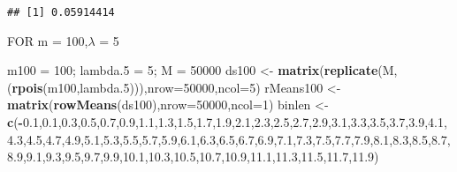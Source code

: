 \documentclass[
]{article}
\newenvironment{Shaded}{\begin{snugshade}}{\end{snugshade}}
\newcommand{\DataTypeTok}[1]{\textcolor[rgb]{0.13,0.29,0.53}{#1}}
\newcommand{\DecValTok}[1]{\textcolor[rgb]{0.00,0.00,0.81}{#1}}
\newcommand{\FloatTok}[1]{\textcolor[rgb]{0.00,0.00,0.81}{#1}}
\newcommand{\KeywordTok}[1]{\textcolor[rgb]{0.13,0.29,0.53}{\textbf{#1}}}
\newcommand{\NormalTok}[1]{#1}
\newcommand{\OperatorTok}[1]{\textcolor[rgb]{0.81,0.36,0.00}{\textbf{#1}}}
\newcommand{\StringTok}[1]{\textcolor[rgb]{0.31,0.60,0.02}{#1}}
\begin{document}
\begin{verbatim}
## [1] 0.05914414
\end{verbatim}

FOR m = 100,\(\lambda\) = 5

\begin{Shaded}
\begin{Highlighting}[]
\NormalTok{m100 =}\StringTok{ }\DecValTok{100}\NormalTok{; lambda}\FloatTok{.5}\NormalTok{ =}\StringTok{ }\DecValTok{5}\NormalTok{; M =}\StringTok{ }\DecValTok{50000}
\NormalTok{ds100 <-}\StringTok{ }\KeywordTok{matrix}\NormalTok{(}\KeywordTok{replicate}\NormalTok{(M,(}\KeywordTok{rpois}\NormalTok{(m100,lambda}\FloatTok{.5}\NormalTok{))),}\DataTypeTok{nrow=}\DecValTok{50000}\NormalTok{,}\DataTypeTok{ncol=}\DecValTok{5}\NormalTok{)}
\NormalTok{rMeans100 <-}\StringTok{ }\KeywordTok{matrix}\NormalTok{(}\KeywordTok{rowMeans}\NormalTok{(ds100),}\DataTypeTok{nrow=}\DecValTok{50000}\NormalTok{,}\DataTypeTok{ncol=}\DecValTok{1}\NormalTok{)}
\NormalTok{binlen <-}\StringTok{ }\KeywordTok{c}\NormalTok{(}\OperatorTok{-}\FloatTok{0.1}\NormalTok{,}\FloatTok{0.1}\NormalTok{,}\FloatTok{0.3}\NormalTok{,}\FloatTok{0.5}\NormalTok{,}\FloatTok{0.7}\NormalTok{,}\FloatTok{0.9}\NormalTok{,}\FloatTok{1.1}\NormalTok{,}\FloatTok{1.3}\NormalTok{,}\FloatTok{1.5}\NormalTok{,}\FloatTok{1.7}\NormalTok{,}\FloatTok{1.9}\NormalTok{,}\FloatTok{2.1}\NormalTok{,}\FloatTok{2.3}\NormalTok{,}\FloatTok{2.5}\NormalTok{,}\FloatTok{2.7}\NormalTok{,}\FloatTok{2.9}\NormalTok{,}\FloatTok{3.1}\NormalTok{,}\FloatTok{3.3}\NormalTok{,}\FloatTok{3.5}\NormalTok{,}\FloatTok{3.7}\NormalTok{,}\FloatTok{3.9}\NormalTok{,}\FloatTok{4.1}\NormalTok{,}\FloatTok{4.3}\NormalTok{,}\FloatTok{4.5}\NormalTok{,}\FloatTok{4.7}\NormalTok{,}\FloatTok{4.9}\NormalTok{,}\FloatTok{5.1}\NormalTok{,}\FloatTok{5.3}\NormalTok{,}\FloatTok{5.5}\NormalTok{,}\FloatTok{5.7}\NormalTok{,}\FloatTok{5.9}\NormalTok{,}\FloatTok{6.1}\NormalTok{,}\FloatTok{6.3}\NormalTok{,}\FloatTok{6.5}\NormalTok{,}\FloatTok{6.7}\NormalTok{,}\FloatTok{6.9}\NormalTok{,}\FloatTok{7.1}\NormalTok{,}\FloatTok{7.3}\NormalTok{,}\FloatTok{7.5}\NormalTok{,}\FloatTok{7.7}\NormalTok{,}\FloatTok{7.9}\NormalTok{,}\FloatTok{8.1}\NormalTok{,}\FloatTok{8.3}\NormalTok{,}\FloatTok{8.5}\NormalTok{,}\FloatTok{8.7}\NormalTok{,}\FloatTok{8.9}\NormalTok{,}\FloatTok{9.1}\NormalTok{,}\FloatTok{9.3}\NormalTok{,}\FloatTok{9.5}\NormalTok{,}\FloatTok{9.7}\NormalTok{,}\FloatTok{9.9}\NormalTok{,}\FloatTok{10.1}\NormalTok{,}\FloatTok{10.3}\NormalTok{,}\FloatTok{10.5}\NormalTok{,}\FloatTok{10.7}\NormalTok{,}\FloatTok{10.9}\NormalTok{,}\FloatTok{11.1}\NormalTok{,}\FloatTok{11.3}\NormalTok{,}\FloatTok{11.5}\NormalTok{,}\FloatTok{11.7}\NormalTok{,}\FloatTok{11.9}\NormalTok{)}

\end{Highlighting}
\end{Shaded}
\end{document}
